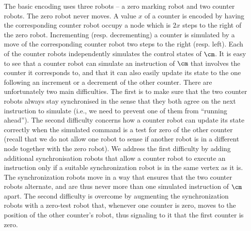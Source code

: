 The basic encoding uses three robots -- a zero marking robot and two counter robots. The zero robot never moves. A value $x$ of a counter is encoded by having the corresponding counter robot occupy a node which is $2x$ steps to the right of the zero robot. Incrementing (resp. decrementing) a counter is simulated by a move of the corresponding counter robot two steps to the right (resp. left). Each of the counter robots independently simulates the control states of $\cm$. It is easy to see that a counter robot can simulate an instruction of $\cm$ that involves the counter it corresponds to, and that it can also easily update its state to the one following an increment or a decrement of the other counter. There are unfortunately two main difficulties. The first is to make sure that the two counter robots always stay synchronised in the sense that they both agree on the next instruction to simulate (i.e., we need to prevent one of them from ``running ahead''). The second difficulty concerns how a counter robot can update its state correctly when the simulated command is a test for zero of the other counter (recall that we do not allow one robot to sense if another robot is in a different node together with the zero robot). We address the first difficulty by adding additional synchronisation robots that allow a counter robot to execute an instruction only if a suitable synchronization robot is in the same vertex as it is. The   synchronization robots move in a way that ensures that the two counter robots alternate, and are thus never more than one simulated instruction of $\cm$ apart. The second difficulty is overcome by augmenting the synchronization robots with a zero-test robot that, whenever one counter is zero, moves to the position of the other counter's robot, thus signaling to it that the first counter is zero.

